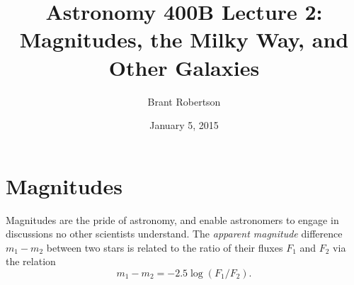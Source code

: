 \documentclass[12pt]{article}
\title{Astronomy 400B Lecture 2: Magnitudes, the Milky Way, and Other Galaxies}
\author{Brant Robertson}
\date{January 5, 2015}
\begin{document}
\maketitle

\section{Magnitudes}

Magnitudes are the pride of astronomy, and enable astronomers to
engage in discussions no other scientists understand. The
{\it apparent magnitude}
difference $m_1 - m_2$ 
between two stars is related to the ratio of their fluxes
$F_1$ and $F_2$ 
via the relation
\begin{equation}
\label{eqn:apparent_magnitude_difference}
m_{1} - m_{2} = -2.5 \log (F_1 / F_2).
\end{equation}
\end{document}

